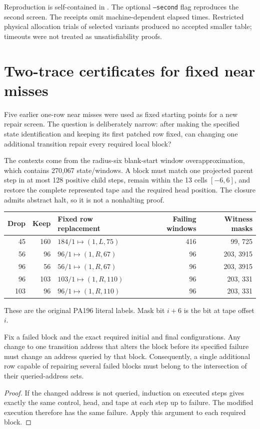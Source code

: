 Reproduction is self-contained in .
The optional \texttt{--second} flag reproduces the second screen. The
receipts omit machine-dependent elapsed times. Restricted physical
allocation trials of selected variants produced no accepted smaller table;
timeouts were not treated as unsatisfiability proofs.

\section{Two-trace certificates for fixed near misses}\label{sec:obstruction}

Five earlier one-row near misses were used as fixed starting points for a
new repair screen. The question is deliberately narrow: after making the
specified state identification and keeping its first patched row fixed,
can changing one additional transition repair every required local block?

The contexts come from the radius-six blank-start window overapproximation,
which contains 270,067 state/windows. A block must match one projected
parent step in at most 128 positive child steps, remain within the 13 cells
$[-6,6]$, and restore the complete represented tape and the required head
position. The closure admits abstract halt, so it is not a nonhalting proof.

\begin{center}\small
\begin{tabular}{@{}rrlrr@{}}
\toprule
Drop&Keep&Fixed row replacement&Failing windows&Witness masks\\
\midrule
45&160&$184/1\mapsto(1,L,75)$&416&99, 725\\
56&96&$96/1\mapsto(1,R,67)$&96&203, 3915\\
96&56&$56/1\mapsto(1,R,67)$&96&203, 3915\\
96&103&$103/1\mapsto(1,R,110)$&96&203, 331\\
103&96&$96/1\mapsto(1,R,110)$&96&203, 331\\
\bottomrule
\end{tabular}
\end{center}
These are the original PA196 literal labels. Mask bit $i+6$ is the bit at
tape offset $i$.

\begin{lemma}
Fix a failed block and the exact required initial and final configurations.
Any change to one transition address that alters the block before its
specified failure must change an address queried by that block.
Consequently, a single additional row capable of repairing several failed
blocks must belong to the intersection of their queried-address sets.
\end{lemma}
\begin{proof}
If the changed address is not queried, induction on executed steps gives
exactly the same control, head, and tape at each step up to failure. The
modified execution therefore has the same failure. Apply this argument to
each required block.
\end{proof}

